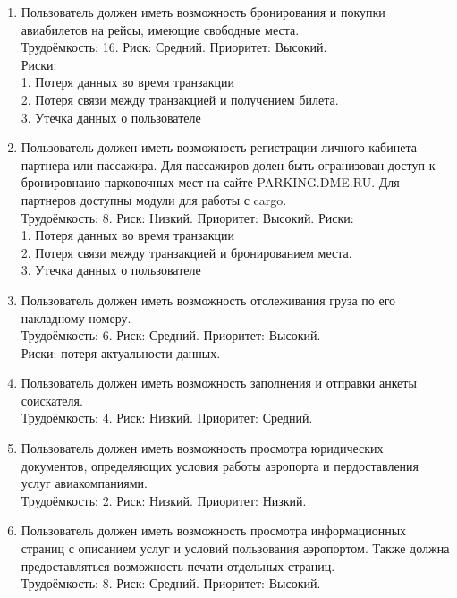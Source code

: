\begin{enumerate}
    \item Пользователь должен иметь возможность бронирования и 
          покупки авиабилетов на рейсы, имеющие свободные места. \\
          Трудоёмкость: 16. Риск: Средний. Приоритет: Высокий. \\
          Риски: \\
          1. Потеря данных во время транзакции \\
          2. Потеря связи между транзакцией и получением билета.\\
          3. Утечка данных о пользователе

    \item Пользователь должен иметь возможность регистрации личного 
          кабинета партнера или пассажира. Для пассажиров долен быть 
          огранизован доступ к бронировнаию парковочных мест на сайте 
          PARKING.DME.RU. Для партнеров доступны модули для работы с cargo. \\
          Трудоёмкость: 8. Риск: Низкий. Приоритет: Высокий.
          Риски: \\
          1. Потеря данных во время транзакции \\
          2. Потеря связи между транзакцией и бронированием места. \\
          3. Утечка данных о пользователе
          
    \item Пользователь должен иметь возможность отслеживания груза 
          по его накладному номеру. \\
          Трудоёмкость: 6. Риск: Средний. Приоритет: Высокий. \\
          Риски: потеря актуальности данных.

    \item Пользователь должен иметь возможность заполнения и отправки 
          анкеты соискателя. \\
          Трудоёмкость: 4. Риск: Низкий. Приоритет: Средний.

    \item Пользователь должен иметь возможность просмотра юридических 
          документов, определяющих условия работы аэропорта и пердоставления 
          услуг авиакомпаниями. \\
          Трудоёмкость: 2. Риск: Низкий. Приоритет: Низкий.

    \item Пользователь должен иметь возможность просмотра информационных 
          страниц с описанием услуг и условий пользования аэропортом. 
          Также должна предоставляться возможность печати отдельных страниц. \\
          Трудоёмкость: 8. Риск: Средний. Приоритет: Высокий.

\end{enumerate}
